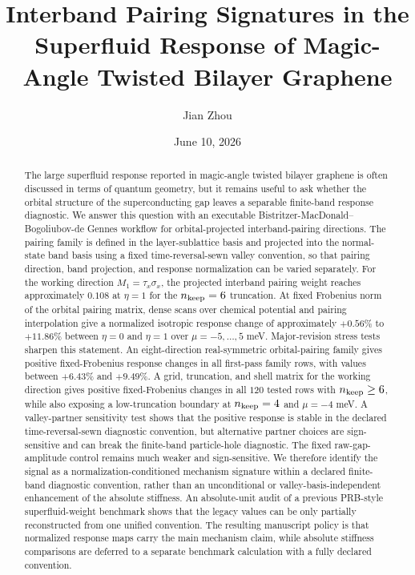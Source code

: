 \documentclass[aps,prb,reprint,superscriptaddress,floatfix,nofootinbib]{revtex4-2}
\begin{document}
\title{Interband Pairing Signatures in the Superfluid Response of Magic-Angle Twisted Bilayer Graphene}

\author{Jian Zhou}

\date{June 10, 2026}

\begin{abstract}
The large superfluid response reported in magic-angle twisted bilayer graphene
is often discussed in terms of quantum geometry, but it remains useful to ask
whether the orbital structure of the superconducting gap leaves a separable
finite-band response diagnostic.
We answer this question with an executable
Bistritzer-MacDonald--Bogoliubov-de Gennes workflow for orbital-projected
interband-pairing directions.
The pairing family is defined in the layer-sublattice basis and projected into
the normal-state band basis using a fixed time-reversal-sewn valley convention,
so that pairing direction, band projection, and response normalization can be
varied separately.
For the working direction $M_1=\tau_x\sigma_x$, the projected interband
pairing weight reaches approximately $0.108$ at $\eta=1$ for the
$n_{\rm keep}=6$ truncation.
At fixed Frobenius norm of the orbital pairing matrix, dense scans over
chemical potential and pairing interpolation give a normalized isotropic
response change of approximately $+0.56\%$ to $+11.86\%$ between $\eta=0$ and
$\eta=1$ over $\mu=-5,\ldots,5$ meV.
Major-revision stress tests sharpen this statement.  An eight-direction
real-symmetric orbital-pairing family gives positive fixed-Frobenius response
changes in all first-pass family rows, with values between $+6.43\%$ and
$+9.49\%$.  A grid, truncation, and shell matrix for the working direction
gives positive fixed-Frobenius changes in all $120$ tested rows with
$n_{\rm keep}\ge 6$, while also exposing a low-truncation boundary at
$n_{\rm keep}=4$ and $\mu=-4$ meV.  A valley-partner sensitivity test shows
that the positive response is stable in the declared time-reversal-sewn
diagnostic convention, but alternative partner choices are sign-sensitive and
can break the finite-band particle-hole diagnostic.
The fixed raw-gap-amplitude control remains much weaker and sign-sensitive.
We therefore identify the signal as a normalization-conditioned mechanism
signature within a declared finite-band diagnostic convention, rather than an
unconditional or valley-basis-independent enhancement of the absolute
stiffness.
An absolute-unit audit of a previous PRB-style superfluid-weight benchmark
shows that the legacy values can be only partially reconstructed from one
unified convention.
The resulting manuscript policy is that normalized response maps carry the
main mechanism claim, while absolute stiffness comparisons are deferred to a
separate benchmark calculation with a fully declared convention.
\end{abstract}
\end{document}
